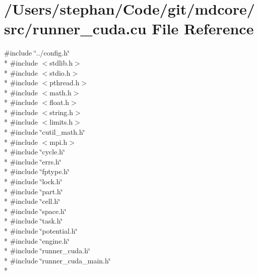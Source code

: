\hypertarget{runner__cuda_8cu}{\section{/\-Users/stephan/\-Code/git/mdcore/src/runner\-\_\-cuda.cu File Reference}
\label{runner__cuda_8cu}
}
{\ttfamily \#include \char`\"{}../config.\-h\char`\"{}}\\*
{\ttfamily \#include $<$stdlib.\-h$>$}\\*
{\ttfamily \#include $<$stdio.\-h$>$}\\*
{\ttfamily \#include $<$pthread.\-h$>$}\\*
{\ttfamily \#include $<$math.\-h$>$}\\*
{\ttfamily \#include $<$float.\-h$>$}\\*
{\ttfamily \#include $<$string.\-h$>$}\\*
{\ttfamily \#include $<$limits.\-h$>$}\\*
{\ttfamily \#include \char`\"{}cutil\-\_\-math.\-h\char`\"{}}\\*
{\ttfamily \#include $<$mpi.\-h$>$}\\*
{\ttfamily \#include \char`\"{}cycle.\-h\char`\"{}}\\*
{\ttfamily \#include \char`\"{}errs.\-h\char`\"{}}\\*
{\ttfamily \#include \char`\"{}fptype.\-h\char`\"{}}\\*
{\ttfamily \#include \char`\"{}lock.\-h\char`\"{}}\\*
{\ttfamily \#include \char`\"{}part.\-h\char`\"{}}\\*
{\ttfamily \#include \char`\"{}cell.\-h\char`\"{}}\\*
{\ttfamily \#include \char`\"{}space.\-h\char`\"{}}\\*
{\ttfamily \#include \char`\"{}task.\-h\char`\"{}}\\*
{\ttfamily \#include \char`\"{}potential.\-h\char`\"{}}\\*
{\ttfamily \#include \char`\"{}engine.\-h\char`\"{}}\\*
{\ttfamily \#include \char`\"{}runner\-\_\-cuda.\-h\char`\"{}}\\*
{\ttfamily \#include \char`\"{}runner\-\_\-cuda\-\_\-main.\-h\char`\"{}}\\*
